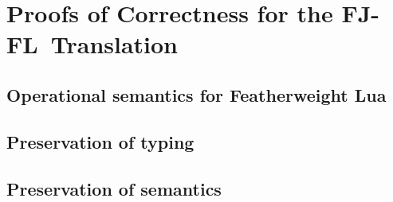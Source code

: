 \chapter{Proofs of Correctness for the FJ-FL~Translation}
\label{extra:fj-fl-proofs}

\section{Operational semantics for Featherweight Lua}

\section{Preservation of typing}

\section{Preservation of semantics}


